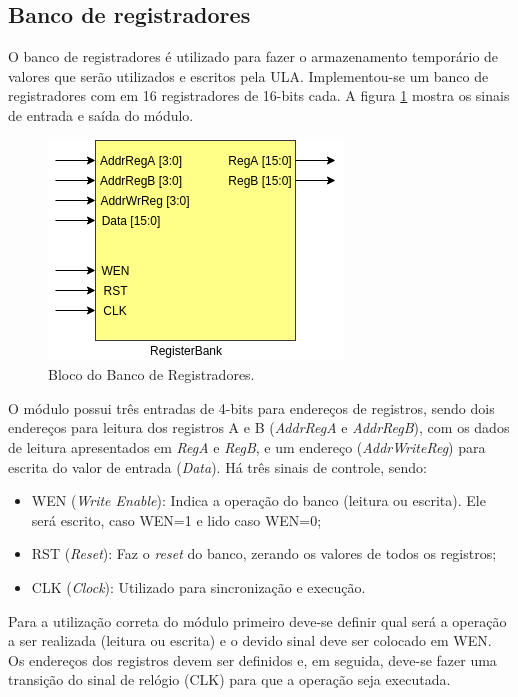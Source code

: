 \documentclass[11pt,a4paper,titlepage]{article}
\begin{document}
\subsection{Banco de registradores}\label{subsec:imp-br}

O banco de registradores é utilizado para fazer o armazenamento temporário de valores que serão utilizados e escritos pela ULA. Implementou-se um banco de registradores com em 16 registradores de 16-bits cada. A figura \ref{fig:blocoregbank} mostra os sinais de entrada e saída do módulo.

\begin{figure}[h]
\centering
\includegraphics[scale=0.5]{images/RegisterBank.png}
\caption{Bloco do Banco de Registradores.}
\label{fig:blocoregbank}
\end{figure}

O módulo possui três entradas de 4-bits para endereços de registros, sendo dois endereços para leitura dos registros A e B (\textit{AddrRegA} e \textit{AddrRegB}), com os dados de leitura apresentados em \textit{RegA} e \textit{RegB}, e um endereço (\textit{AddrWriteReg}) para escrita do valor de entrada (\textit{Data}). Há três sinais de controle, sendo:

\begin{itemize}
\item WEN (\textit{Write Enable}): Indica a operação do banco (leitura ou escrita). Ele será escrito, caso WEN=1 e lido caso WEN=0;
\item RST (\textit{Reset}): Faz o \textit{reset} do banco, zerando os valores de todos os registros;
\item CLK (\textit{Clock}): Utilizado para sincronização e execução.
\end{itemize}

Para a utilização correta do módulo primeiro deve-se definir qual será a operação a ser realizada (leitura ou escrita) e o devido sinal deve ser colocado em WEN. Os endereços dos registros devem ser definidos e, em seguida, deve-se fazer uma transição do sinal de relógio (CLK) para que a operação seja executada.
\end{document}

